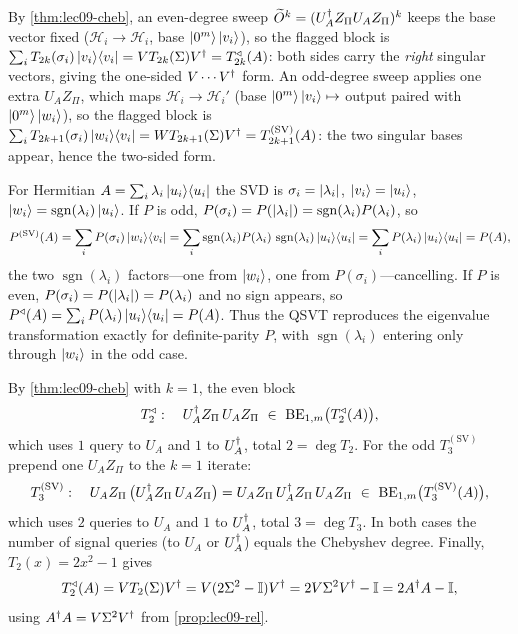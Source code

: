 \begin{solution}
By \cref{thm:lec09-cheb}, an even-degree sweep $\widetilde O^k=(U_A^{\dagger} Z_\Pi U_A
Z_\Pi)^k$ keeps the base vector fixed ($\mathcal H_i\to\mathcal H_i$, base
$\ket{0^m}\ket{v_i}$), so the flagged block is $\sum_i T_{2k}(\sigma_i)\ket{v_i}\!\bra{v_i}
=VT_{2k}(\Sigma)V^{\dagger}=T_{2k}^{\triangleleft}(A)$: both sides carry the \emph{right}
singular vectors, giving the one-sided $V\cdots V^{\dagger}$ form. An odd-degree sweep applies
one extra $U_A Z_\Pi$, which maps $\mathcal H_i\to\mathcal H_i'$ (base
$\ket{0^m}\ket{v_i}\mapsto$ output paired with $\ket{0^m}\ket{w_i}$), so the flagged
block is $\sum_i T_{2k+1}(\sigma_i)\ket{w_i}\!\bra{v_i}=WT_{2k+1}(\Sigma)V^{\dagger}
=T_{2k+1}^{(\mathrm{SV})}(A)$: the two singular bases appear, hence the two-sided form.

For Hermitian $A=\sum_i\lambda_i\ket{u_i}\!\bra{u_i}$ the SVD is $\sigma_i=\left\lvert \lambda_i \right\rvert$,
$\ket{v_i}=\ket{u_i}$, $\ket{w_i}=\operatorname{sgn}(\lambda_i)\ket{u_i}$. If $P$ is odd,
$P(\sigma_i)=P(\left\lvert \lambda_i \right\rvert)=\operatorname{sgn}(\lambda_i)P(\lambda_i)$, so
\[
  P^{(\mathrm{SV})}(A)=\sum_i P(\sigma_i)\ket{w_i}\!\bra{v_i}
  =\sum_i \operatorname{sgn}(\lambda_i)P(\lambda_i)\,\operatorname{sgn}(\lambda_i)
     \ket{u_i}\!\bra{u_i}=\sum_i P(\lambda_i)\ket{u_i}\!\bra{u_i}=P(A),
\]
the two $\operatorname{sgn}(\lambda_i)$ factors---one from $\ket{w_i}$, one from
$P(\sigma_i)$---cancelling. If $P$ is even, $P(\sigma_i)=P(\left\lvert \lambda_i \right\rvert)=P(\lambda_i)$
and no sign appears, so $P^{\triangleleft}(A)=\sum_i P(\lambda_i)\ket{u_i}\!\bra{u_i}=P(A)$.
Thus the QSVT reproduces the eigenvalue transformation exactly for definite-parity $P$,
with $\operatorname{sgn}(\lambda_i)$ entering only through $\ket{w_i}$ in the odd case.
\end{solution}

\begin{solution}
By \cref{thm:lec09-cheb} with $k=1$, the even block
\[
  T_2^{\triangleleft}:\quad U_A^{\dagger} Z_\Pi\,U_A Z_\Pi
  \ \in\ \mathrm{BE}_{1,m}\bigl(T_2^{\triangleleft}(A)\bigr),
\]
which uses $1$ query to $U_A$ and $1$ to $U_A^{\dagger}$, total $2=\deg T_2$. For the odd
$T_3^{(\mathrm{SV})}$ prepend one $U_A Z_\Pi$ to the $k=1$ iterate:
\[
  T_3^{(\mathrm{SV})}:\quad U_A Z_\Pi\,\bigl(U_A^{\dagger} Z_\Pi\,U_A Z_\Pi\bigr)
  =U_A Z_\Pi\,U_A^{\dagger} Z_\Pi\,U_A Z_\Pi
  \ \in\ \mathrm{BE}_{1,m}\bigl(T_3^{(\mathrm{SV})}(A)\bigr),
\]
which uses $2$ queries to $U_A$ and $1$ to $U_A^{\dagger}$, total $3=\deg T_3$. In both cases
the number of signal queries (to $U_A$ or $U_A^{\dagger}$) equals the Chebyshev degree.
Finally, $T_2(x)=2x^2-1$ gives
\[
  T_2^{\triangleleft}(A)=V T_2(\Sigma)V^{\dagger}=V(2\Sigma^2-\mathbb{I})V^{\dagger}=2V\Sigma^2 V^{\dagger}-\mathbb{I}
  =2A^{\dagger} A-\mathbb{I},
\]
using $A^{\dagger} A=V\Sigma^2 V^{\dagger}$ from \cref{prop:lec09-rel}.
\end{solution}

